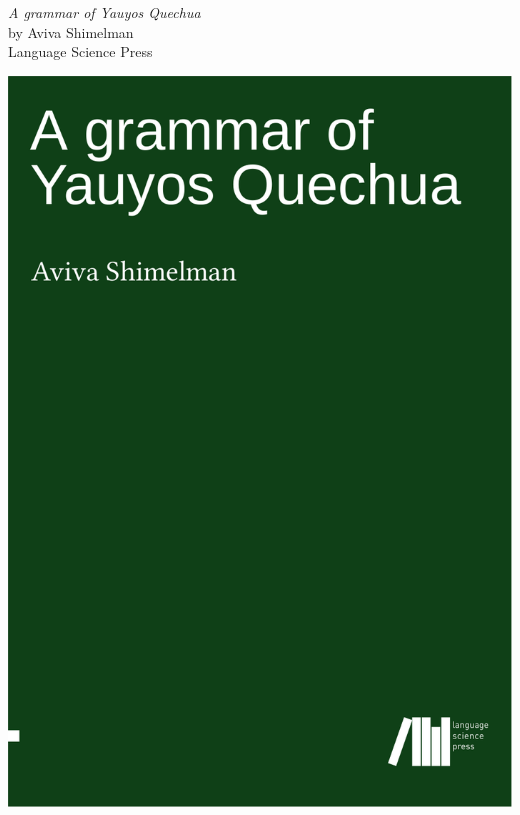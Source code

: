 \restoregeometry

    \vfill
    \begin{minipage}{0.6\linewidth}\raggedright\Large
            \textit{A grammar of Yauyos Quechua}\\
            by Aviva Shimelman\\
            Language Science Press
        \end{minipage}\begin{minipage}{0.4\linewidth}\raggedleft
            \includegraphics[width=\linewidth]{./FullPages/CoverAviva-crop.pdf}
    \end{minipage}

